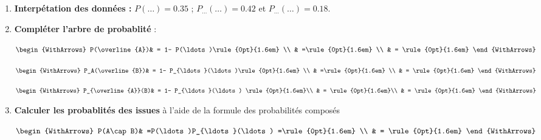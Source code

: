 \documentclass[main.tex]{subfiles}
\begin{document}
\begin{exercise}
	\begin{enumerate}[label={\arabic*)},leftmargin=*]
		\item \textbf{Interpétation des données :} $P(\ldots)= 0.35$ ; $P_{\ldots}(\ldots)=0.42$ et $P_{\ldots}(\ldots)=0.18$.
		\item \textbf{Compléter l'arbre de probablité} :\\
		\noindent
		\parbox{0.33\linewidth}{
			$\begin{WithArrows}
				P(\overline{A})& = 1- P(\ldots )\rule{0pt}{1.6em} \\
				& =\rule{0pt}{1.6em} \\
				& =	\rule{0pt}{1.6em}
			\end{WithArrows}$\hfill 
		}\hfill 
		\parbox{0.33\linewidth}{
			$\begin{WithArrows}
				P_A(\overline{B})& = 1- P_{\ldots}(\ldots )\rule{0pt}{1.6em} \\
				& =\rule{0pt}{1.6em} \\
				& =	\rule{0pt}{1.6em}
			\end{WithArrows}$\hfill
		}\hfill 
		\parbox{0.33\linewidth}{
			$\begin{WithArrows}
				P_{\overline{A}}(B)& = 1- P_{\ldots}(\ldots ) \rule{0pt}{1.6em}\\
				& = \rule{0pt}{1.6em}\\
				& =	\rule{0pt}{1.6em}
			\end{WithArrows}$\hfill
		}  
		\item \textbf{Calculer les probablités des issues} à l'aide de la formule des probabilités composés \\
		\noindent
		\parbox{0.48\linewidth}{
			$\begin{WithArrows}
				P(A\cap B)& =P(\ldots)P_{\ldots}(\ldots) =\rule{0pt}{1.6em}  \\
				& =  \rule{0pt}{1.6em}
			\end{WithArrows}$\hfill 
		}\hfill 

\end{enumerate}
\end{exercise}
\end{document}
